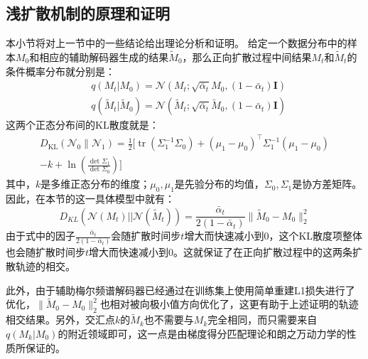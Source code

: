 \subsection{浅扩散机制的原理和证明}
\label{sup:proof}
本小节将对上一节中的一些结论给出理论分析和证明。
给定一个数据分布中的样本$M_0$和相应的辅助解码器生成的结果$\widetilde{M}_0$，那么正向扩散过程中间结果$M_t$和$\widetilde{M}_t$的条件概率分布就分别是：
\begin{align}
&q(M_t| M_0)=\mathcal{N}(M_t; \sqrt{\bar\alpha_t}M_0, (1-\bar\alpha_t)\mathbf{I}) \\
&q(\widetilde{M}_t| \widetilde{M}_0)=\mathcal{N}(\widetilde{M}_t;\sqrt{\bar\alpha_t}\widetilde{M}_0, (1-\bar\alpha_t)\mathbf{I})
\end{align}
这两个正态分布间的KL散度就是：
\begin{equation}
\begin{split}
D_{\mathrm{KL}}\left(\mathcal{N}_{0} \| \mathcal{N}_{1}\right)=\frac{1}{2}[\operatorname{tr}\left(\Sigma_{1}^{-1} \Sigma_{0}\right)+\left(\mu_{1}-\mu_{0}\right)^{\top} \Sigma_{1}^{-1}\left(\mu_{1}-\mu_{0}\right) \\
-k+\ln (\frac{\operatorname{det} \Sigma_{1}}{\operatorname{det} \Sigma_{0}})]
\end{split}
\end{equation}
其中，$k$是多维正态分布的维度；$\mu_{0}, \mu_{1}$是先验分布的均值，$\Sigma_{0}, \Sigma_{1}$是协方差矩阵。因此，在本节的这一具体模型中就有：
\begin{equation}
D_{KL}(\mathcal{N}(M_t) || \mathcal{N}(\widetilde{M}_t)) = \frac{\bar\alpha_t}{2(1-\bar\alpha_t)} \|\widetilde{M}_0-M_0 \| _2^2
\end{equation}
由于式中的因子$\frac{\bar\alpha_t}{2(1-\bar\alpha_t)}$会随扩散时间步$t$增大而快速减小到0，这个KL散度项整体也会随扩散时间步$t$增大而快速减小到0。这就保证了在正向扩散过程中的这两条扩散轨迹的相交。

此外，由于辅助梅尔频谱解码器已经通过在训练集上使用简单重建L1损失进行了优化，$\|\widetilde{M}_0-M_0 \| _2^2$也相对被向极小值方向优化了，这更有助于上述证明的轨迹相交结果。另外，交汇点$k$的$\widetilde{M}_k$也不需要与$M_k$完全相同，而只需要来自$q(M_k|M_0)$的附近领域即可，这一点是由梯度得分匹配理论和朗之万动力学的性质所保证的。
